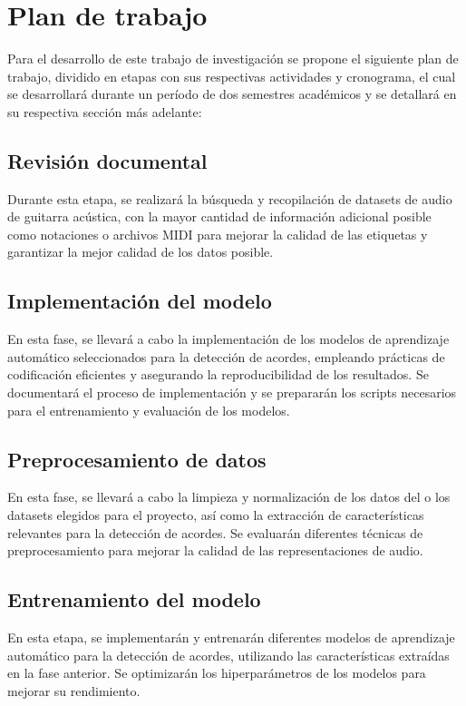 \section{Plan de trabajo}

Para el desarrollo de este trabajo de investigación se propone el siguiente plan de trabajo, dividido en etapas con sus respectivas actividades y cronograma, el cual se desarrollará durante un período de dos semestres académicos y se detallará en su respectiva sección más adelante:

\subsection{Revisión documental}

Durante esta etapa, se realizará la búsqueda y recopilación de datasets de audio de guitarra acústica, con la mayor cantidad de información adicional posible como notaciones o archivos MIDI para mejorar la calidad de las etiquetas y garantizar la mejor calidad de los datos posible.

\subsection{Implementación del modelo}
En esta fase, se llevará a cabo la implementación de los modelos de aprendizaje automático seleccionados para la detección de acordes, empleando prácticas de codificación eficientes y asegurando la reproducibilidad de los resultados. Se documentará el proceso de implementación y se prepararán los scripts necesarios para el entrenamiento y evaluación de los modelos.

\subsection{Preprocesamiento de datos}

En esta fase, se llevará a cabo la limpieza y normalización de los datos del o los datasets elegidos para el proyecto, así como la extracción de características relevantes para la detección de acordes. Se evaluarán diferentes técnicas de preprocesamiento para mejorar la calidad de las representaciones de audio.

\subsection{Entrenamiento del modelo}

En esta etapa, se implementarán y entrenarán diferentes modelos de aprendizaje automático para la detección de acordes, utilizando las características extraídas en la fase anterior. Se optimizarán los hiperparámetros de los modelos para mejorar su rendimiento.

